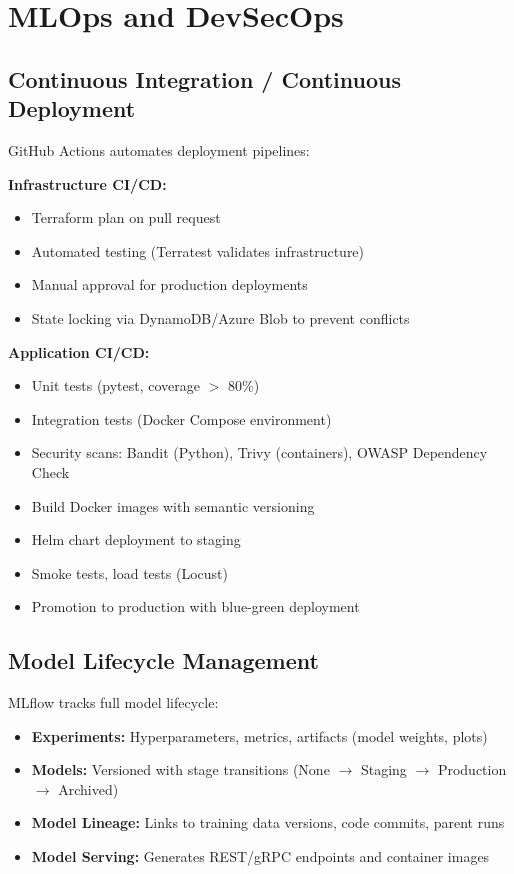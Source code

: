 \section{MLOps and DevSecOps}\label{sec:arch-mlops}
\subsection{Continuous Integration / Continuous Deployment}
GitHub Actions automates deployment pipelines:

\textbf{Infrastructure CI/CD:}
\begin{itemize}
    \item Terraform plan on pull request
    \item Automated testing (Terratest validates infrastructure)
    \item Manual approval for production deployments
    \item State locking via DynamoDB/Azure Blob to prevent conflicts
\end{itemize}

\textbf{Application CI/CD:}
\begin{itemize}
    \item Unit tests (pytest, coverage $>$ 80\%)
    \item Integration tests (Docker Compose environment)
    \item Security scans: Bandit (Python), Trivy (containers), OWASP Dependency Check
    \item Build Docker images with semantic versioning
    \item Helm chart deployment to staging
    \item Smoke tests, load tests (Locust)
    \item Promotion to production with blue-green deployment
\end{itemize}

\subsection{Model Lifecycle Management}
MLflow tracks full model lifecycle:
\begin{itemize}
    \item \textbf{Experiments:} Hyperparameters, metrics, artifacts (model weights, plots)
    \item \textbf{Models:} Versioned with stage transitions (None $\rightarrow$ Staging $\rightarrow$ Production $\rightarrow$ Archived)
    \item \textbf{Model Lineage:} Links to training data versions, code commits, parent runs
    \item \textbf{Model Serving:} Generates REST/gRPC endpoints and container images
\end{itemize}

